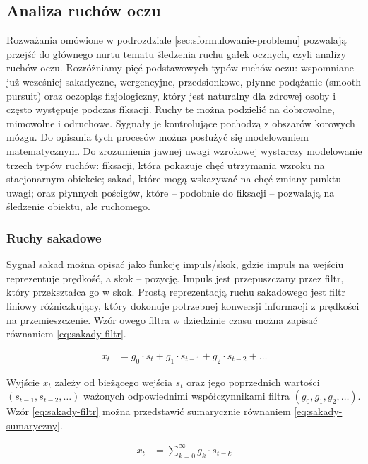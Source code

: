 \documentclass[a4paper,twoside,12pt]{book}
\begin{document}
\subsection{Analiza ruchów oczu}
\label{subsec:analiza-ruchow-oczu}

Rozważania omówione w podrozdziale \ref{sec:sformulowanie-problemu} pozwalają przejść do głównego nurtu tematu śledzenia ruchu gałek ocznych, czyli analizy ruchów oczu. Rozróżniamy pięć podstawowych typów ruchów oczu: wspomniane już wcześniej sakadyczne, wergencyjne, przedsionkowe, płynne podążanie (smooth pursuit) oraz oczopląs fizjologiczny, który jest naturalny dla zdrowej osoby i często występuje podczas fiksacji. Ruchy te można podzielić na dobrowolne, mimowolne i odruchowe. Sygnały je kontrolujące pochodzą z obszarów korowych mózgu. Do opisania tych procesów można posłużyć się modelowaniem matematycznym. Do zrozumienia jawnej uwagi wzrokowej wystarczy modelowanie trzech typów ruchów: fiksacji, która pokazuje chęć utrzymania wzroku na stacjonarnym obiekcie; sakad, które mogą wskazywać na chęć zmiany punktu uwagi; oraz płynnych pościgów, które -- podobnie do fiksacji -- pozwalają na śledzenie obiektu, ale ruchomego. 

\subsubsection{Ruchy sakadowe}
\label{subsubsec:ruchy-sakadowe}

Sygnał sakad można opisać jako funkcję impuls/skok, gdzie impuls na wejściu reprezentuje prędkość, a skok -- pozycję. Impuls jest przepuszczany przez filtr, który przekształca go w skok. Prostą reprezentacją ruchu sakadowego jest filtr liniowy różniczkujący, który dokonuje potrzebnej konwersji informacji z prędkości na przemieszczenie. Wzór owego filtra w dziedzinie czasu można zapisać równaniem \ref{eq:sakady-filtr}.

\begin{align}
	x_t &= g_0 \cdot s_t + g_1 \cdot s_{t-1} + g_2 \cdot s_{t-2} + \ldots
	\label{eq:sakady-filtr}
\end{align}

Wyjście $x_t$ zależy od bieżącego wejścia $s_t$ oraz jego poprzednich wartości $(s_{t-1}, s_{t-2}, \ldots)$ ważonych odpowiednimi współczynnikami filtra $(g_0, g_1, g_2, \ldots)$. Wzór \ref{eq:sakady-filtr} można przedstawić sumarycznie równaniem \ref{eq:sakady-sumaryczny}.

\begin{align}
	x_t &= \sum_{k=0}^{\infty} g_k \cdot s_{t-k}
	\label{eq:sakady-sumaryczny}
\end{align}
\end{document}
